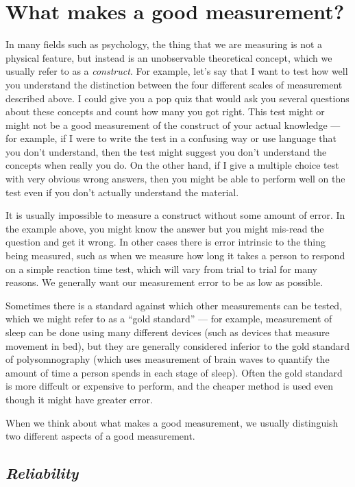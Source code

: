 \documentclass[]{book}
\theoremstyle{definition}
\theoremstyle{definition}
\theoremstyle{definition}
\theoremstyle{remark}
\begin{document}
\section{What makes a good
measurement?}\label{what-makes-a-good-measurement}

In many fields such as psychology, the thing that we are measuring is
not a physical feature, but instead is an unobservable theoretical
concept, which we usually refer to as a \emph{construct}. For example,
let's say that I want to test how well you understand the distinction
between the four different scales of measurement described above. I
could give you a pop quiz that would ask you several questions about
these concepts and count how many you got right. This test might or
might not be a good measurement of the construct of your actual
knowledge --- for example, if I were to write the test in a confusing
way or use language that you don't understand, then the test might
suggest you don't understand the concepts when really you do. On the
other hand, if I give a multiple choice test with very obvious wrong
answers, then you might be able to perform well on the test even if you
don't actually understand the material.

It is usually impossible to measure a construct without some amount of
error. In the example above, you might know the answer but you might
mis-read the question and get it wrong. In other cases there is error
intrinsic to the thing being measured, such as when we measure how long
it takes a person to respond on a simple reaction time test, which will
vary from trial to trial for many reasons. We generally want our
measurement error to be as low as possible.

Sometimes there is a standard against which other measurements can be
tested, which we might refer to as a ``gold standard'' --- for example,
measurement of sleep can be done using many different devices (such as
devices that measure movement in bed), but they are generally considered
inferior to the gold standard of polysomnography (which uses measurement
of brain waves to quantify the amount of time a person spends in each
stage of sleep). Often the gold standard is more diffcult or expensive
to perform, and the cheaper method is used even though it might have
greater error.

When we think about what makes a good measurement, we usually
distinguish two different aspects of a good measurement.

\subsection{\texorpdfstring{\emph{Reliability}}{Reliability}}\label{reliability}
\end{document}

